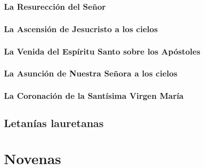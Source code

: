 \documentclass[a4paper,11pt, oneside]{report}
\begin{document}
      \subsection{La Resurección del Señor}
        
      \subsection{La Ascensión de Jesucristo a los cielos}
          
      \subsection{La Venida del Espíritu Santo sobre los Apóstoles}

      \subsection{La Asunción de Nuestra Señora a los cielos}

      \subsection{La Coronación de la Santísima Virgen María}

    \section{Letanías lauretanas}

  \chapter{Novenas}

  \printbibliography
\end{document}

